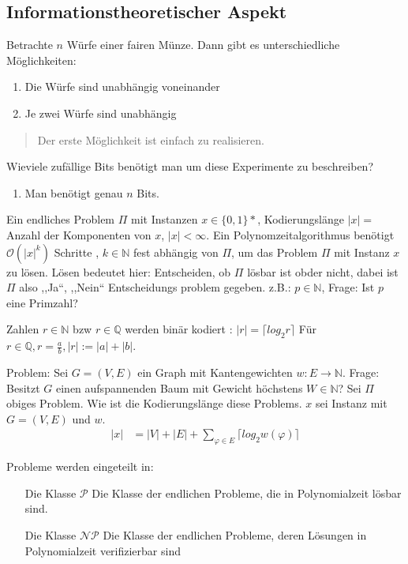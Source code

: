 \subsection{Informationstheoretischer Aspekt}
Betrachte $n$ Würfe einer fairen Münze. Dann gibt es unterschiedliche Möglichkeiten:
\begin{enumerate}
\item Die Würfe sind unabhängig voneinander
\item Je zwei Würfe sind unabhängig
\end{enumerate}
\begin{quote}
Der erste Möglichkeit ist einfach zu realisieren.
\end{quote}
Wieviele zufällige Bits benötigt man um diese Experimente zu beschreiben?
\begin{enumerate}
\item Man benötigt genau $n$ Bits.

\end{enumerate}

Ein endliches Problem $\Pi$ mit Instanzen $x \in \{0,1\}*$, Kodierungslänge $\lvert x \rvert =$ Anzahl der Komponenten %
von $x$, $\lvert x \rvert < \infty$. Ein Polynomzeitalgorithmus benötigt $\mathcal O(\lvert x \rvert ^ k)$ Schritte %
, $k \in \mathbb N$ fest abhängig von $\Pi$, um das Problem $\Pi$ mit Instanz $x$ zu lösen.
Lösen bedeutet hier: Entscheiden, ob $\Pi$ lösbar ist obder nicht, dabei ist $\Pi$ also ,,Ja``, ,,Nein`` Entscheidungs%
problem gegeben. z.B.: $p \in \mathbb N$, Frage: Ist $p$ eine Primzahl?

Zahlen $r \in \mathbb N$ bzw $r \in \mathbb Q$ werden binär kodiert : $\lvert r \rvert = \lceil log_2 r \rceil $ %
Für $r \in \mathbb Q, r = \frac{a}{b}, \lvert r \rvert := \lvert a \rvert + \lvert b \rvert$.

\begin{example}
Problem: Sei $G=(V,E)$ ein Graph mit Kantengewichten $w: E \rightarrow \mathbb N$.
Frage: Besitzt $G$ einen aufspannenden Baum mit Gewicht höchstens $W \in \mathbb N$?
Sei $\Pi$ obiges Problem. Wie ist die Kodierungslänge diese Problems.
$x$ sei Instanz mit $G=(V,E)$ und $w$.
\begin{align*}
\lvert x \rvert &= \lvert V \rvert + \lvert E \rvert + \sum\limits_{\varphi \in E} \lceil log_2 w(\varphi) \rceil
\end{align*}
\end{example}
\begin{remark}
Probleme werden eingeteilt in:
\end{remark}
\begin{itemize}
	\item[Die Klasse $\mathcal P$] Die Klasse der endlichen Probleme, die in Polynomialzeit lösbar sind.
	\item[Die Klasse $\mathcal{NP}$] Die Klasse der endlichen Probleme, deren Lösungen in Polynomialzeit verifizierbar %
sind
\end{itemize}
